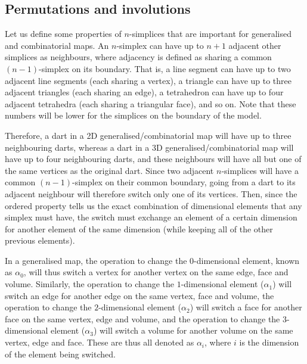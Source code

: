 \subsection{Permutations and involutions}

Let us define some properties of \(n\)-simplices that are important for generalised and combinatorial maps.
An \(n\)-simplex can have up to \(n+1\) adjacent other simplices as neighbours, where adjacency is defined as sharing a common \((n-1)\)-simplex on its boundary.
That is, a line segment can have up to two adjacent line segments (each sharing a vertex), a triangle can have up to three adjacent triangles (each sharing an edge), a tetrahedron can have up to four adjacent tetrahedra (each sharing a triangular face), and so on.
Note that these numbers will be lower for the simplices on the boundary of the model.

Therefore, a dart in a 2D generalised/combinatorial map will have up to three neighbouring darts, whereas a dart in a 3D generalised/combinatorial map will have up to four neighbouring darts, and these neighbours will have all but one of the same vertices as the original dart.
Since two adjacent \(n\)-simplices will have a common \((n-1)\)-simplex on their common boundary, going from a dart to its adjacent neighbour will therefore switch only one of its vertices.
Then, since the ordered property tells us the exact combination of dimensional elements that any simplex must have, the switch must exchange an element of a certain dimension for another element of the same dimension (while keeping all of the other previous elements).

In a generalised map, the operation to change the \(0\)-dimensional element, known as \(\alpha_0\), will thus switch a vertex for another vertex on the same edge, face and volume.
Similarly, the operation to change the \(1\)-dimensional element (\(\alpha_1\)) will switch an edge for another edge on the same vertex, face and volume, the operation to change the \(2\)-dimensional element (\(\alpha_2\)) will switch a face for another face on the same vertex, edge and volume, and the operation to change the \(3\)-dimensional element (\(\alpha_3\)) will switch a volume for another volume on the same vertex, edge and face.
These are thus all denoted as \(\alpha_i\), where \(i\) is the dimension of the element being switched.

